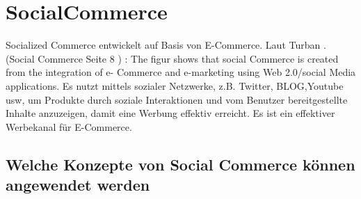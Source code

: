 \section{SocialCommerce}

Socialized Commerce  entwickelt auf Basis von E-Commerce. Laut Turban . (Social Commerce Seite 8 ) :  The figur shows that social Commerce is created from the integration of e- Commerce and e-marketing using  Web 2.0/social Media applications. Es nutzt  mittels sozialer Netzwerke, z.B. Twitter, BLOG,Youtube usw, um Produkte durch soziale Interaktionen und vom Benutzer bereitgestellte Inhalte anzuzeigen, damit  eine  Werbung effektiv erreicht. Es ist ein effektiver Werbekanal für E-Commerce.


\subsection{Welche Konzepte von Social Commerce können angewendet werden}

